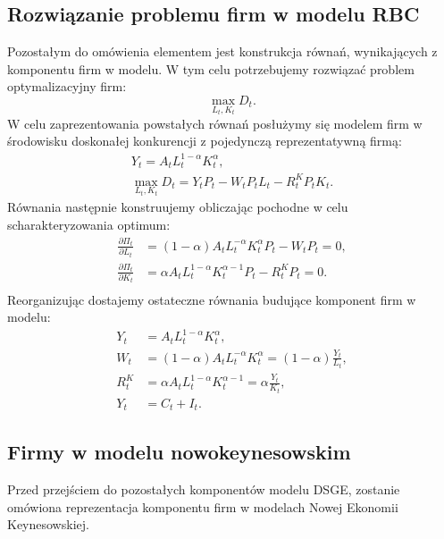 \subsection{Rozwiązanie problemu firm w modelu RBC}
\label{sec:solution_firms_rbc}

Pozostałym do omówienia elementem jest konstrukcja równań, wynikających z komponentu firm w modelu. W tym celu potrzebujemy rozwiązać problem optymalizacyjny firm:
\begin{equation}
    \max_{L_t, K_t} D_t.
\end{equation}
W celu zaprezentowania powstałych równań posłużymy się modelem firm w środowisku doskonałej konkurencji z pojedynczą reprezentatywną firmą:
\begin{gather}
    Y_t = A_t L_t^{1-\alpha} K_t^{\alpha}, \\
    \max_{L_t, K_t} D_t = Y_t P_t - W_t P_t L_t - R^K_t P_t K_t.
\end{gather}
Równania następnie konstruujemy obliczając pochodne w celu scharakteryzowania optimum:
\begin{align}
    \frac{\partial \Pi_t}{\partial L_t} &= (1-\alpha) A_t L_t^{-\alpha} K_t^{\alpha} P_t - W_t P_t = 0, \\
    \frac{\partial \Pi_t}{\partial K_t} &= \alpha A_t L_t^{1-\alpha} K_t^{\alpha-1} P_t - R^K_t P_t = 0.\\
\end{align}
Reorganizując dostajemy ostateczne równania budujące komponent firm w modelu:
\begin{align}
    Y_t &= A_t L_t^{1-\alpha} K_t^{\alpha} \label{firms:eq1},\\
    W_t &= (1-\alpha) A_t L_t^{-\alpha} K_t^{\alpha} = (1-\alpha) \frac{Y_t}{L_t} \label{firms:eq2},\\
    R^K_t &= \alpha A_t L_t^{1-\alpha} K_t^{\alpha-1} = \alpha \frac{Y_t}{K_t} \label{firms:eq3},\\
    Y_t &= C_t + I_t.
\end{align}

\subsection{Firmy w modelu nowokeynesowskim}
\label{sec:firms_nek}

Przed przejściem do pozostałych komponentów modelu DSGE, zostanie omówiona reprezentacja komponentu firm w modelach Nowej Ekonomii Keynesowskiej.

